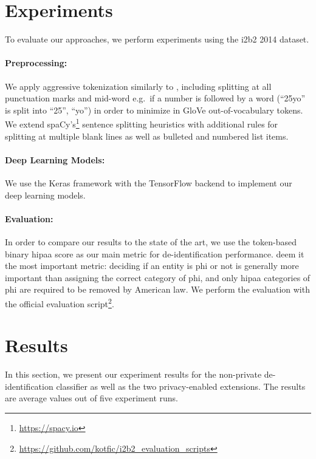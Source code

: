 \section{Experiments}
%
To evaluate our approaches, we perform experiments using the i2b2 2014 dataset.

\paragraph{Preprocessing:}
%
We apply aggressive tokenization similarly to \citet{liu2017identification}, including splitting at all punctuation marks and mid-word e.g.\ if a number is followed by a word (``25yo'' is split into ``25'', ``yo'') in order to minimize in GloVe out-of-vocabulary tokens.
%
We extend spaCy's\footnote{\url{https://spacy.io}} sentence splitting heuristics with additional rules for splitting at multiple blank lines as well as bulleted and numbered list items.

\paragraph{Deep Learning Models:}
%
We use the Keras framework \citep{chollet2015keras} with the TensorFlow backend \citep{abadi2015tensorflow} to implement our deep learning models.
%

\paragraph{Evaluation:}
%
In order to compare our results to the state of the art, we use the token-based binary \ac{hipaa} \fone score as our main metric for de-identification performance.
%
\citet{dernoncourt2017identification} deem it the most important metric: deciding if an entity is \ac{phi} or not is generally more important than assigning the correct category of \ac{phi}, and only \ac{hipaa} categories of \ac{phi} are required to be removed by American law.
%
We perform the evaluation with the official evaluation script\footnote{\url{https://github.com/kotfic/i2b2\_evaluation\_scripts}}.

\section{Results}
%
In this section, we present our experiment results for the non-private de-identification classifier as well as the two privacy-enabled extensions.
%
The results are average values out of five experiment runs.

